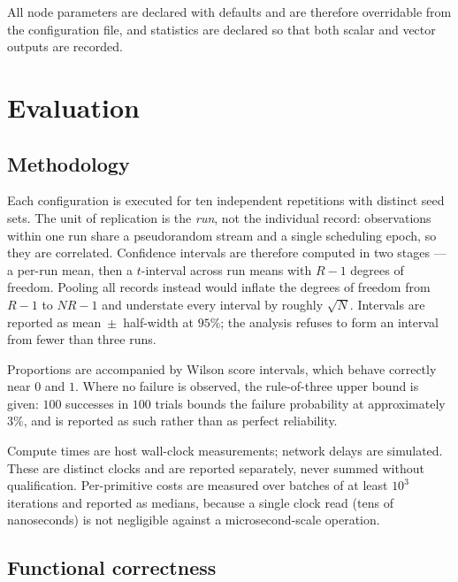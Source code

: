 \documentclass[11pt,a4paper]{article}
\begin{document}
All node parameters are declared with defaults and are therefore overridable from
the configuration file, and statistics are declared so that both scalar and vector
outputs are recorded.


\section{Evaluation}
\label{sec:results}

\subsection{Methodology}
\label{subsec:methodology}

Each configuration is executed for ten independent repetitions with distinct seed
sets. The unit of replication is the \emph{run}, not the individual record:
observations within one run share a pseudorandom stream and a single scheduling
epoch, so they are correlated. Confidence intervals are therefore computed in two
stages --- a per-run mean, then a $t$-interval across run means with $R-1$ degrees
of freedom. Pooling all records instead would inflate the degrees of freedom from
$R-1$ to $NR-1$ and understate every interval by roughly $\sqrt{N}$. Intervals are
reported as mean~$\pm$~half-width at $95\%$; the analysis refuses to form an
interval from fewer than three runs.

Proportions are accompanied by Wilson score intervals, which behave correctly near
$0$ and $1$. Where no failure is observed, the rule-of-three upper bound is given:
$100$ successes in $100$ trials bounds the failure probability at approximately
$3\%$, and is reported as such rather than as perfect reliability.

Compute times are host wall-clock measurements; network delays are simulated.
These are distinct clocks and are reported separately, never summed without
qualification. Per-primitive costs are measured over batches of at least $10^3$
iterations and reported as medians, because a single clock read (tens of
nanoseconds) is not negligible against a microsecond-scale operation.

\subsection{Functional correctness}
\label{subsec:functional}
\end{document}
